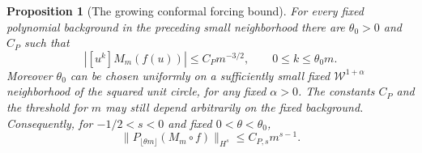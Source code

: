 \documentclass[11pt]{article}
\newtheorem{proposition}{Proposition}[section]
\begin{document}
\begin{proposition}[The growing conformal forcing bound]
\label{prop:conformal-forcing-bound}
For every fixed polynomial background in the preceding small
neighborhood there are $\theta_0>0$ and $C_P$ such that
\begin{equation}\label{eq:conformal-forcing-coefficients}
 |[u^k]M_m(f(u))|\le C_Pm^{-3/2},
 \qquad 0\le k\le\theta_0m.
\end{equation}
Moreover $\theta_0$ can be chosen uniformly on a sufficiently small
fixed $\mathcal W^{1+\alpha}$ neighborhood of the squared unit
circle, for any fixed $\alpha>0$. The constants $C_P$ and the
threshold for $m$ may still depend arbitrarily on the fixed background.
Consequently, for $-1/2<s<0$ and fixed $0<\theta<\theta_0$,
\[
 \|P_{\lfloor\theta m\rfloor}(M_m\circ f)\|_{H^s}
       \le C_{P,s}m^{s-1}.
\]
\end{proposition}
\end{document}
